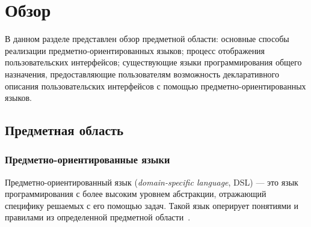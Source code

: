\section{Обзор}
В данном разделе представлен обзор предметной области:
основные способы реализации предметно-ориентированных языков; 
процесс отображения пользовательских интерфейсов;
существующие языки программирования общего назначения, предоставляющие
пользователям возможность декларативного описания пользовательских
интерфейсов с помощью предметно-ориентированных языков.

\subsection{Предметная область}
\subsubsection{Предметно-ориентированные языки}
Предметно-ориентированный язык (\textit{domain-specific language}, DSL) ---
это язык программирования с более высоким уровнем абстракции,
отражающий специфику решаемых с его помощью задач. Такой язык оперирует
понятиями и правилами из определенной предметной области~\cite{book-of-dsls}.

